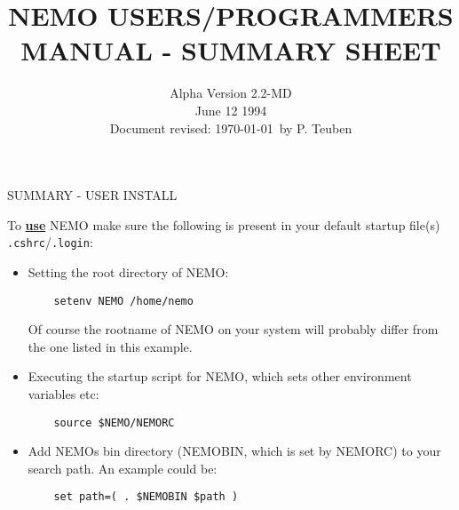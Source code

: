 

\title{NEMO USERS/PROGRAMMERS MANUAL - SUMMARY SHEET}

\date{Alpha Version 2.2-MD \\
 June 12 1994 \\
 Document revised: \today\ by P. Teuben}


\setlength{\parindent}{0pt}
\setlength{\parskip}{2.5mm}

\centerline{SUMMARY - USER INSTALL}

To {\underline {\bf use}} NEMO make sure the following is present in
your default startup file(s) {\tt .cshrc}/{\tt .login}:

\begin{itemize}
\item Setting the root directory
    of NEMO: 
\begin{verbatim}
	setenv NEMO /home/nemo
\end{verbatim}
    Of course the rootname of NEMO on your system will probably differ 
    from the one listed in this example.

\item  Executing the startup script for NEMO, which sets other 
    environment variables etc: 
\begin{verbatim}
	source $NEMO/NEMORC
\end{verbatim}

\item Add NEMOs bin directory (NEMOBIN, which is set by NEMORC)
    to your search path. 
    An example could be:
\begin{verbatim}
 	set path=( . $NEMOBIN $path )
\end{verbatim}
\end{itemize}


